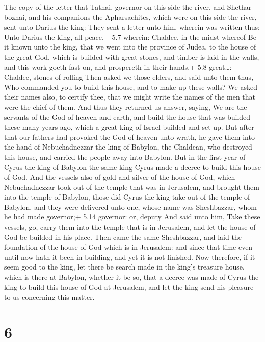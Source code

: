  The copy of the letter that Tatnai, governor on this side
the river, and Shethar-boznai, and his companions the Apharsachites,
which were on this side the river, sent unto Darius the king:
 They sent a letter unto him, wherein was written thus; Unto
Darius the king, all peace.+ 5.7 wherein: Chaldee, in the midst whereof
 Be it known unto the king, that we went into the province
of Judea, to the house of the great God, which is builded with great
stones, and timber is laid in the walls, and this work goeth fast on,
and prospereth in their hands.+ 5.8 great\ldots: Chaldee, stones of
rolling  Then asked we those elders, and said unto them
thus, Who commanded you to build this house, and to make up these walls?
 We asked their names also, to certify thee, that we might
write the names of the men that were the chief of them. 
And thus they returned us answer, saying, We are the servants of the God
of heaven and earth, and build the house that was builded these many
years ago, which a great king of Israel builded and set up.
 But after that our fathers had provoked the God of heaven
unto wrath, he gave them into the hand of Nebuchadnezzar the king of
Babylon, the Chaldean, who destroyed this house, and carried the people
away into Babylon.  But in the first year of Cyrus the king
of Babylon the same king Cyrus made a decree to build this house of God.
 And the vessels also of gold and silver of the house of
God, which Nebuchadnezzar took out of the temple that was in Jerusalem,
and brought them into the temple of Babylon, those did Cyrus the king
take out of the temple of Babylon, and they were delivered unto one,
whose name was Sheshbazzar, whom he had made governor;+ 5.14 governor:
or, deputy  And said unto him, Take these vessels, go,
carry them into the temple that is in Jerusalem, and let the house of
God be builded in his place.  Then came the same
Sheshbazzar, and laid the foundation of the house of God which is in
Jerusalem: and since that time even until now hath it been in building,
and yet it is not finished.  Now therefore, if it seem good
to the king, let there be search made in the king's treasure house,
which is there at Babylon, whether it be so, that a decree was made of
Cyrus the king to build this house of God at Jerusalem, and let the king
send his pleasure to us concerning this matter.

\hypertarget{section-5}{%
\section{6}\label{section-5}}

